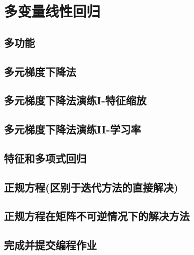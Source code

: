 \chapter{多变量线性回归}

\section{多功能}

\section{多元梯度下降法}

\section{多元梯度下降法演练I-特征缩放}

\section{多元梯度下降法演练II-学习率}

\section{特征和多项式回归}

\section{正规方程(区别于迭代方法的直接解决)}

\section{正规方程在矩阵不可逆情况下的解决方法}

\section{完成并提交编程作业}